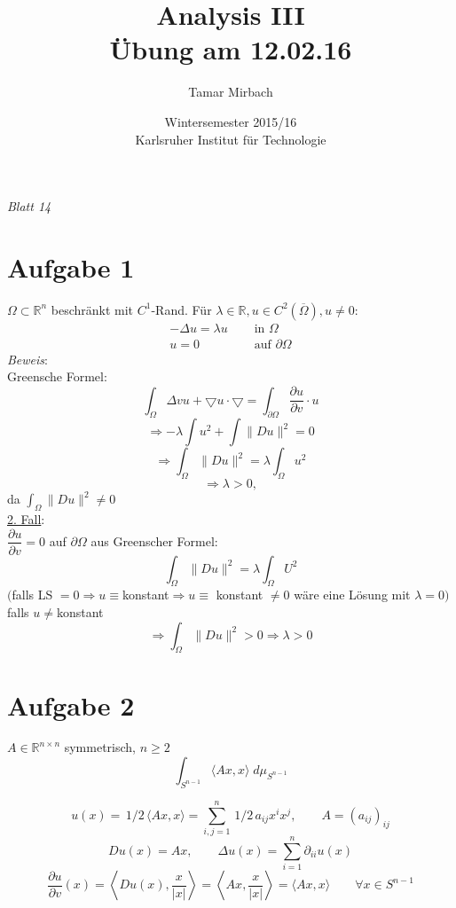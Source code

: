 \documentclass[11pt]{article}
\newcommand{\dom}{\partial\Omega}
\newcommand{\pau}{\partial u}
\newcommand{\pav}{\partial v}
\begin{document}
\title{\textbf{Analysis III}\\ Übung am 12.02.16}
\author{Tamar Mirbach}
\date{Wintersemester 2015/16\\ Karlsruher Institut für Technologie}

\maketitle

\emph{Blatt 14}

\section{Aufgabe 1}
$\Omega \subset \mathbb R^n$ beschränkt mit $C^1$-Rand. Für $\lambda \in \mathbb R, u \in C^2(\overline{\Omega}), u \ne 0$:
\begin{align}
-\Delta u = \lambda u & \quad \text{ in } \Omega \\
u = 0 & \quad \text{ auf } \dom
\end{align}
\emph{Beweis}: \\
Greensche Formel: \\
$$\int_\Omega \Delta v u + \bigtriangledown u \cdotp \bigtriangledown = \int_{\partial \Omega} \dfrac{\pau}{\pav} \cdotp u$$
$$ \Rightarrow -\lambda \int u^2 + \int \|Du\|^2 = 0$$
$$\Rightarrow \int_\Omega \|Du \|^2 = \lambda \int_\Omega u^2$$
$$\Rightarrow \lambda > 0, $$ da $\int_\Omega \|Du\|^2 \ne 0$ \\

\underline{2. Fall}:\\
$\dfrac{\pau}{\pav} = 0$ auf $\dom$ aus Greenscher Formel:
$$\int_\Omega \|Du\|^2 = \lambda \int_\Omega U^2$$%
$($falls LS $ = 0 \Rightarrow u \equiv $konstant$ \Rightarrow u \equiv $ konstant $ \ne 0$ wäre eine Lösung mit $\lambda = 0)$ \\
falls $u \ne $konstant 
$$\Rightarrow \int_\Omega \|Du\|^2 > 0 \Rightarrow \lambda > 0$$


\section{Aufgabe 2}
$A \in \mathbb R^{n \times n}$ symmetrisch, $n \geq 2$
$$\int_{S^{n-1}} \langle Ax, x \rangle \; d\mu_{S^{n-1}}$$

\par\bigskip

$$u(x) = \,1/2\, \langle Ax, x \rangle = \sum\limits_{i, j =1}^n \,1/2\, a_{ij} x^i x^j ,\qquad A = (a_{ij})_{ij}$$
$$Du(x) = Ax, \qquad \Delta u(x) = \sum\limits_{i=1}^n \partial_{ii}u(x) $$
$$\dfrac{\pau}{\pav} (x) = \left\langle Du(x), \dfrac{x}{|x|}\right\rangle = \left\langle Ax, \dfrac{x}{|x|} \right \rangle = \langle Ax, x \rangle \qquad \forall x \in S^{n-1}$$
\end{document}
